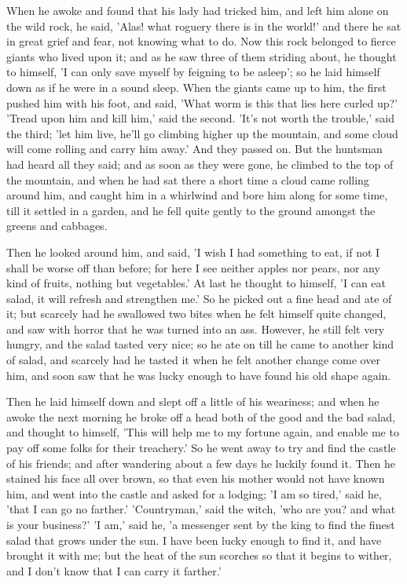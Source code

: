 \documentclass[12pt]{book}
\begin{document}
When he awoke and found that his lady had tricked him, and left him
alone on the wild rock, he said, 'Alas! what roguery there is in the
world!' and there he sat in great grief and fear, not knowing what to
do. Now this rock belonged to fierce giants who lived upon it; and as
he saw three of them striding about, he thought to himself, 'I can
only save myself by feigning to be asleep'; so he laid himself down as
if he were in a sound sleep. When the giants came up to him, the first
pushed him with his foot, and said, 'What worm is this that lies here
curled up?' 'Tread upon him and kill him,' said the second. 'It's not
worth the trouble,' said the third; 'let him live, he'll go climbing
higher up the mountain, and some cloud will come rolling and carry him
away.' And they passed on. But the huntsman had heard all they said;
and as soon as they were gone, he climbed to the top of the mountain,
and when he had sat there a short time a cloud came rolling around
him, and caught him in a whirlwind and bore him along for some time,
till it settled in a garden, and he fell quite gently to the ground
amongst the greens and cabbages.

Then he looked around him, and said, 'I wish I had something to eat,
if not I shall be worse off than before; for here I see neither apples
nor pears, nor any kind of fruits, nothing but vegetables.' At last he
thought to himself, 'I can eat salad, it will refresh and strengthen
me.' So he picked out a fine head and ate of it; but scarcely had he
swallowed two bites when he felt himself quite changed, and saw with
horror that he was turned into an ass. However, he still felt very
hungry, and the salad tasted very nice; so he ate on till he came to
another kind of salad, and scarcely had he tasted it when he felt
another change come over him, and soon saw that he was lucky enough to
have found his old shape again.

Then he laid himself down and slept off a little of his weariness; and
when he awoke the next morning he broke off a head both of the good
and the bad salad, and thought to himself, 'This will help me to my
fortune again, and enable me to pay off some folks for their
treachery.' So he went away to try and find the castle of his friends;
and after wandering about a few days he luckily found it. Then he
stained his face all over brown, so that even his mother would not
have known him, and went into the castle and asked for a lodging; 'I
am so tired,' said he, 'that I can go no farther.' 'Countryman,' said
the witch, 'who are you? and what is your business?' 'I am,' said he,
'a messenger sent by the king to find the finest salad that grows
under the sun. I have been lucky enough to find it, and have brought
it with me; but the heat of the sun scorches so that it begins to
wither, and I don't know that I can carry it farther.'
\end{document}
